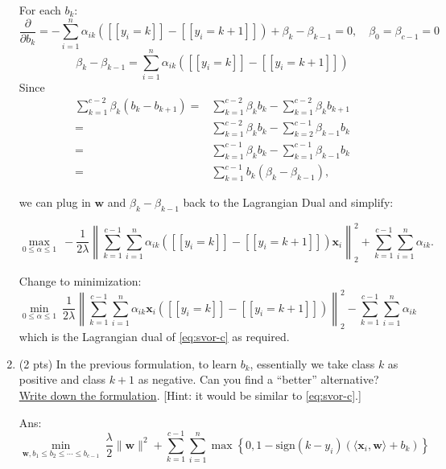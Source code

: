 \documentclass[10pt]{article}
\newcommand{\wv}{\mathbf{w}}
\newcommand{\xv}{\mathbf{x}}
\newcommand{\inner}[2]{\langle #1, #2 \rangle}
\newcommand{\pred}[1]{[\![#1]\!]}
\newcommand{\ans}[1]{{\color{orange}\textsf{Ans}: #1}}
\begin{document}
\begin{exercise}
\begin{enumerate}
          For each $b_k$:
          $$
            \frac{\partial}{\partial b_k} = -\sum_{i=1}^n \alpha_{ik} (\pred{y_i = k}- \pred{y_i=k+1})+\beta_k-\beta_{k-1} = 0,\quad\beta_0=\beta_{c-1}=0
          $$
          $$\beta_k-\beta_{k-1}=\sum_{i=1}^n \alpha_{ik} (\pred{y_i = k}- \pred{y_i=k+1})$$
          Since
          \begin{equation*}
            \begin{aligned}
              \sum_{k=1}^{c-2} \beta_k (b_k - b_{k+1})= & \sum_{k=1}^{c-2} \beta_k b_k-\sum_{k=1}^{c-2} \beta_k b_{k+1}   \\
              =                                         & \sum_{k=1}^{c-2} \beta_k b_k-\sum_{k=2}^{c-1} \beta_{k-1} b_{k} \\
              =                                         & \sum_{k=1}^{c-1} \beta_k b_k-\sum_{k=1}^{c-1} \beta_{k-1} b_{k} \\
              =                                         & \sum_{k=1}^{c-1}b_k(\beta_k-\beta_{k-1}),
            \end{aligned}
          \end{equation*}

          we can plug in $\wv$ and $\beta_k-\beta_{k-1}$ back to the Lagrangian Dual and simplify:

          $$
            \max_{0\leq\alpha\leq1}~ -\frac{1}{2\lambda} \left\|\sum_{k=1}^{c-1} \sum_{i=1}^n \alpha_{ik} (\pred{y_i = k}- \pred{y_i=k+1}) \xv_i\right\|_2^2 + \sum_{k=1}^{c-1} \sum_{i=1}^n \alpha_{ik}.
          $$

          Change to minimization:
          $$
            \boxed{\min_{0\leq\alpha\leq1}~
              \frac{1}{2\lambda} \left\|\sum_{k=1}^{c-1} \sum_{i=1}^n \alpha_{ik}\xv_i (\pred{y_i = k}- \pred{y_i=k+1}) \right\|_2^2 - \sum_{k=1}^{c-1} \sum_{i=1}^n \alpha_{ik}}
          $$
          which is the Lagrangian dual of \eqref{eq:svor-c} as required.
            {\vskip0.5cm}
    \item (2 pts) In the previous formulation, to learn $b_k$, essentially we take class $k$ as positive and class $k+1$ as negative. Can you find a ``better'' alternative? \uline{Write down the formulation}. [Hint: it would be similar to \eqref{eq:svor-c}.]

          \ans\\
          $$
            \boxed{\min_{\wv, b_1 \leq b_2\leq \cdots \leq b_{c-1}}~ \frac{\lambda}{2} \|\wv\|^2 + \sum_{k=1}^{c-1} \sum_{i=1}^n \max\left\{0, 1 - \mathrm{sign}(k-y_i) \left(\inner{\xv_i}{\wv} + b_k\right)\right\}}
          $$


\end{enumerate}
\end{exercise}
\end{document}
